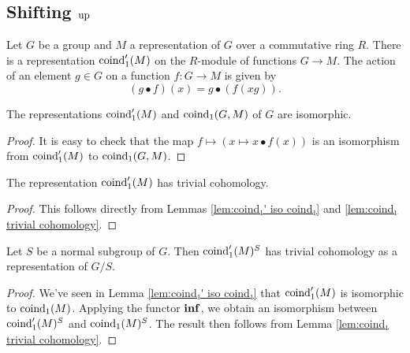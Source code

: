 \subsection{Shifting $\mathrm{up}$}

\begin{definition} \label{def:coind₁'}
	Let $G$ be a group and $M$ a representation of $G$ over a commutative ring $R$.
	There is a representation $\mathrm{coind}_1' (M)$ on the $R$-module of
	functions $G \to M$.
	The action of an element $g \in G$ on a function $f : G \to M$ is given by
	\[
		(g \bullet f)(x) = g \bullet (f (xg)).
	\]
\end{definition}

\begin{lemma}	\label{lem:coind₁' iso coind₁}
	\leanok
	The representations $\mathrm{coind}_1'(M)$ and $\mathrm{coind}_1(G,M)$ of $G$ are isomorphic.
\end{lemma}

\begin{proof}
	It is easy to check that the map $f \mapsto (x \mapsto x \bullet f(x))$ is an isomorphism
	from $\mathrm{coind}_1'(M)$ to $\mathrm{coind}_1(G,M)$.
\end{proof}

\begin{corollary}	\label{cor:coind₁' trivial cohomology}
	\leanok
	The representation $\mathrm{coind}_1'(M)$ has trivial cohomology.
\end{corollary}

\begin{proof}
	This follows directly from Lemmas \ref{lem:coind₁' iso coind₁}
	and \ref{lem:coind₁ trivial cohomology}.
	\leanok
\end{proof}

\begin{corollary}	\label{cor:coind₁' invariants trivial cohomology}
	Let $S$ be a normal subgroup of $G$. Then $\mathrm{coind}_1'(M)^S$ has trivial cohomology as a
	representation of $G/S$.
\end{corollary}

\begin{proof}
	We've seen in Lemma \ref{lem:coind₁' iso coind₁} that $\mathrm{coind}_1'(M)$
	is isomorphic to $\mathrm{coind}_1(M)$.
	Applying the functor $\mathbf{inf}$, we obtain an isomorphism between $\mathrm{coind}_1'(M)^S$ and $\mathrm{coind}_1(M)^S$.
	The result then follows from Lemma \ref{lem:coind₁ trivial cohomology}.
\end{proof}

